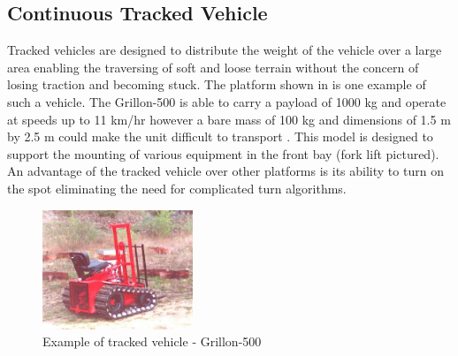 \documentclass[main.tex]{subfiles}
\begin{document}
\subsection{Continuous Tracked Vehicle}
Tracked vehicles are designed to distribute the weight of the vehicle over a large area enabling the traversing of soft and loose terrain without the concern of losing traction and becoming stuck. The platform shown in  is one example of such a vehicle. The Grillon-500 is able to carry a payload of 1000 kg and operate at speeds up to 11 km/hr however a bare mass of 100 kg and dimensions of 1.5 m by 2.5 m could make the unit difficult to transport \parencite{cinamGrillon}. This model is designed to support the mounting of various equipment in the front bay (fork lift pictured). An advantage of the tracked vehicle over other platforms is its ability to turn on the spot eliminating the need for complicated turn algorithms. 
\begin{figure}[ht]
\includegraphics[width=0.4\textwidth]{4-ConceptDesign/Grillon-500.jpg}
\centering
\caption[Example of tracked vehicle - Grillon-500]{Example of tracked vehicle - Grillon-500 \parencite{cinamGrillon}} 
\end{figure}
\end{document}
